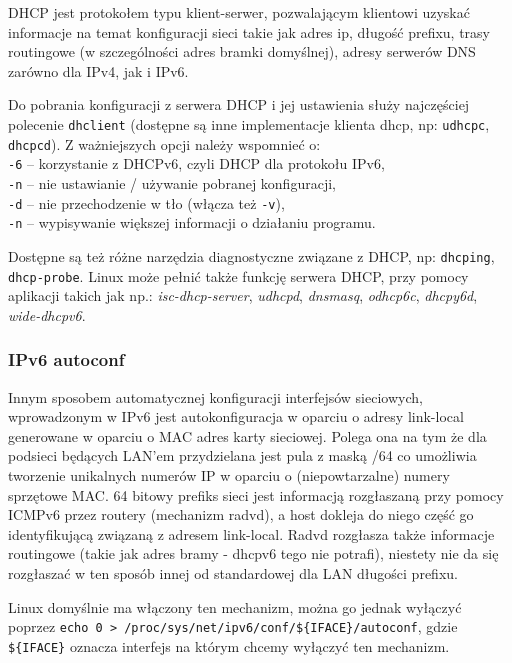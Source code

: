 \documentclass{pdfBooklets}
\begin{document}
DHCP jest protokołem typu klient-serwer, pozwalającym klientowi uzyskać informacje na temat konfiguracji sieci takie jak adres ip, długość prefixu, trasy routingowe (w szczególności adres bramki domyślnej), adresy serwerów DNS zarówno dla IPv4, jak i IPv6.

Do pobrania konfiguracji z serwera DHCP i jej ustawienia służy najczęściej polecenie \Verb#dhclient# (dostępne są inne implementacje klienta dhcp, np: \Verb#udhcpc#, \Verb#dhcpcd#).
Z ważniejszych opcji należy wspomnieć o:\\
	\hspace*{1cm} \Verb#-6# – korzystanie z DHCPv6, czyli DHCP dla protokołu IPv6,\\
	\hspace*{1cm} \Verb#-n# – nie ustawianie / używanie pobranej konfiguracji,\\
	\hspace*{1cm} \Verb#-d# – nie przechodzenie w tło (włącza też \Verb#-v#),\\
	\hspace*{1cm} \Verb#-n# – wypisywanie większej informacji o działaniu programu.

Dostępne są też różne narzędzia diagnostyczne związane z DHCP, np: \Verb#dhcping#, \Verb#dhcp-probe#.
Linux może pełnić także funkcję serwera DHCP, przy pomocy aplikacji takich jak np.: 
	\textit{isc-dhcp-server}, \textit{udhcpd}, \textit{dnsmasq}, \textit{odhcp6c}, \textit{dhcpy6d}, \textit{wide-dhcpv6}.

\subsubsection{IPv6 autoconf}

Innym sposobem automatycznej konfiguracji interfejsów sieciowych, wprowadzonym w IPv6 jest autokonfiguracja w oparciu o adresy link-local generowane w oparciu o MAC adres karty sieciowej.
	Polega ona na tym że dla podsieci będących LAN'em przydzielana jest pula z maską /64 co umożliwia tworzenie unikalnych numerów IP w oparciu o (niepowtarzalne) numery sprzętowe MAC.
	64 bitowy prefiks sieci jest informacją rozgłaszaną przy pomocy ICMPv6 przez routery (mechanizm radvd), a host dokleja do niego część go identyfikującą związaną z adresem link-local.
	Radvd rozgłasza także informacje routingowe (takie jak adres bramy - dhcpv6 tego nie potrafi), niestety nie da się rozgłaszać w ten sposób innej od standardowej dla LAN długości prefixu.

Linux domyślnie ma włączony ten mechanizm, można go jednak wyłączyć poprzez \Verb#echo 0 > /proc/sys/net/ipv6/conf/${IFACE}/autoconf#, gdzie \Verb#${IFACE}# oznacza interfejs na którym chcemy wyłączyć ten mechanizm.
\end{document}
